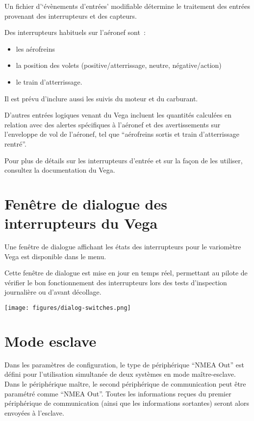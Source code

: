 Un fichier d'`évènements d'entrées' modifiable détermine le traitement des entrées provenant des interrupteurs et des capteurs.

Des interrupteurs habituels sur l'aéronef sont~:
\begin{itemize}
\item les aérofreins
\item la position des volets (positive/atterrissage, neutre, négative/action)
\item le train d'atterrissage.
\end{itemize}

Il est prévu d'inclure aussi les suivis du moteur et du carburant.

D'autres entrées logiques venant du Vega incluent les quantités calculées en relation avec des alertes spécifiques à l'aéronef et des avertissements sur l'enveloppe de vol de l'aéronef, tel que ``aérofreins sortis et train d'atterrissage rentré''.  

Pour plus de détails sur les interrupteurs d'entrée et sur la façon de les utiliser, consultez la documentation du Vega.

\section{Fenêtre de dialogue des interrupteurs du Vega}

Une fenêtre de dialogue affichant les états des interrupteurs pour le variomètre Vega est disponible dans le menu.

Cette fenêtre de dialogue est mise en jour en temps réel, permettant au pilote de vérifier le bon fonctionnement des interrupteurs lors des tests d'inspection journalière ou d'avant décollage.

\begin{center}
\texttt{[image: figures/dialog-switches.png]}
\end{center}

\section{Mode esclave}

Dans les paramètres de configuration, le type de périphérique ``NMEA Out'' est défini pour l'utilisation simultanée de deux systèmes en mode maître-esclave.
Dans le périphérique maître, le second périphérique de communication peut être paramétré comme ``NMEA Out''.
Toutes les informations reçues du premier périphérique de communication (ainsi que les informations sortantes) seront alors envoyées à l'esclave.

